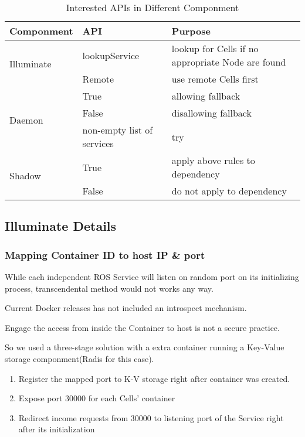 \begin{table}
    \renewcommand{\arraystretch}{1.3}
    \caption{Interested APIs in Different Componment}
    \label{table:int}
    \centering
    \begin{tabular}{|l|l|l|}
        \hline
        \bfseries Componment & \bfseries  API & \bfseries Purpose \\
        \hline
        \multirow{2}{*}{Illuminate}  & lookupService & lookup for Cells if no appropriate Node are found \\
        \cline{2-3}
                                     & Remote & use remote Cells first \\
        \hline
        \multirow{3}{*}{Daemon}      & True   & allowing fallback \\
        \cline{2-3}
                                     & False  & disallowing fallback \\
        \cline{2-3}
                                     & non-empty list of services & try  \\
        \hline
        \multirow{2}{*}{Shadow} & True   & apply above rules to dependency \\
        \cline{2-3}
                                     & False  & do not apply to dependency \\
        \hline
    \end{tabular}
\end{table} 

\subsection{Illuminate Details}
\subsubsection{Mapping Container ID to host IP \& port}
While each independent ROS Service will listen on random port on its initializing process,
transcendental method would not works any way. 

Current Docker releases has not included an introspect mechanism.

Engage the access from inside the Container to host is not a secure practice.

So we used a three-stage solution with a extra container running a Key-Value storage componment(Radis for this case).
\begin{enumerate}
    \item Register the mapped port to K-V storage right after container was created.
    \item Expose port 30000 for each Cells' container
    \item Redirect income requests from 30000 to listening port of the Service right after its initialization
\end{enumerate}

